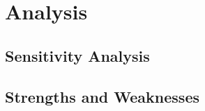 \section{Analysis}\label{sec:analysis}

\subsection{Sensitivity Analysis}


\subsection{Strengths and Weaknesses}
